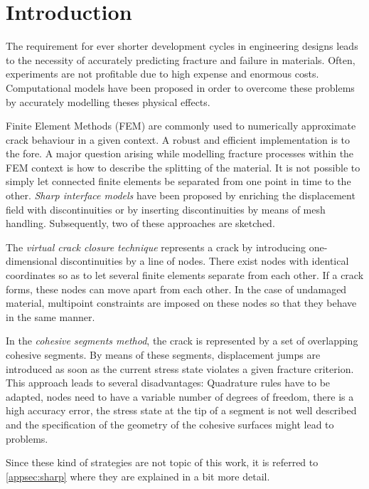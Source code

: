 \section{Introduction} \label{sec:intro}

The requirement for ever shorter development cycles in engineering designs leads to the necessity of accurately predicting fracture and failure in materials. Often, experiments are not profitable due to high expense and enormous costs. Computational models have been proposed in order to overcome these problems by accurately modelling theses physical effects. 

Finite Element Methods (FEM) are commonly used to numerically approximate crack behaviour in a given context. A robust and efficient implementation is to the fore. A major question arising while modelling fracture processes within the FEM context is how to describe the splitting of the material. It is not possible to simply let connected finite elements be separated from one point in time to the other. \textit{Sharp interface models} have been proposed by enriching the displacement field with discontinuities or by inserting discontinuities by means of mesh handling. Subsequently, two of these approaches are sketched.

The \textit{virtual crack closure technique} represents a crack by introducing one-dimensional discontinuities by a line of nodes. There exist nodes with identical coordinates so as to let several finite elements separate from each other. If a crack forms, these nodes can move apart from each other. In the case of undamaged material, multipoint constraints are imposed on these nodes so that they behave in the same manner. \cite{03_SotA_virtClos} 

In the \textit{cohesive segments method}, the crack is represented by a set of overlapping cohesive segments. By means of these segments, displacement jumps are introduced as soon as the current stress state violates a given fracture criterion. This approach leads to several disadvantages: Quadrature rules have to be adapted, nodes need to have a variable number of degrees of freedom, there is a high accuracy error, the stress state at the tip of a segment is not well described and the specification of the geometry of the cohesive surfaces might lead to problems. \cite{02_SotA_cohes}\cite{01_SotA_cohes_dyn} 

Since these kind of strategies are not topic of this work, it is referred to \ref{appsec:sharp} where they are explained in a bit more detail.

